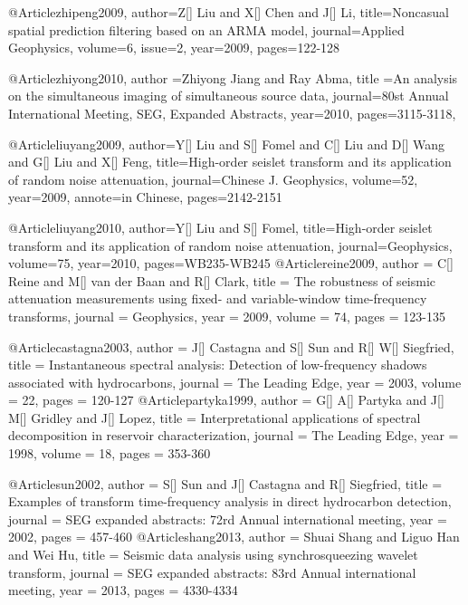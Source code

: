 @Article{zhipeng2009,
author={Z[] Liu and X[] Chen and J[] Li},
title={Noncasual spatial prediction filtering based on an ARMA model},
journal={Applied Geophysics},
volume=6,
issue=2,
year=2009,
pages={122-128}
}

@Article{zhiyong2010,
  author ={Zhiyong Jiang and Ray Abma},
  title ={An analysis on the simultaneous imaging of simultaneous source data},
  journal={80st Annual International Meeting, SEG, Expanded Abstracts},
  year=2010,
  pages={3115-3118},
}

@Article{liuyang2009,
author={Y[] Liu and S[] Fomel and C[] Liu and D[] Wang and G[] Liu and X[] Feng},
title={High-order seislet transform and its application of random noise attenuation},
journal={Chinese J. Geophysics},
volume=52,
year=2009,
annote={in Chinese},
pages={2142-2151}
}

@Article{liuyang2010,
author={Y[] Liu and S[] Fomel},
title={High-order seislet transform and its application of random noise attenuation},
journal={Geophysics},
volume=75,
year=2010,
pages={WB235-WB245}
}
@Article{reine2009,
  author = 	 {C[] Reine and M[] van der Baan and R[] Clark},
  title = 	 {The robustness of seismic attenuation measurements using fixed- and variable-window time-frequency transforms},
  journal = 	 {Geophysics},
  year = 	 2009,
  volume = 	 74,
  pages = 	 {123-135}
}


@Article{castagna2003,
  author = 	 {J[] Castagna and S[] Sun and R[] W[] Siegfried},
  title = 	 {Instantaneous spectral analysis: Detection of low-frequency shadows associated with hydrocarbons},
  journal = 	 {The Leading Edge},
  year = 	 2003,
  volume = 	 22,
  pages = 	 {120-127}
}
@Article{partyka1999,
  author = 	 {G[] A[] Partyka and J[] M[] Gridley and J[] Lopez},
  title = 	 {Interpretational applications of spectral decomposition in reservoir characterization},
  journal = 	 {The Leading Edge},
  year = 	 1998,
  volume = 	 18,
  pages = 	 {353-360}
}


@Article{sun2002,
  author = 	 {S[] Sun and J[] Castagna and R[] Siegfried},
  title = 	 {Examples of 
   transform time-frequency analysis in direct hydrocarbon detection},
  journal = 	 {SEG expanded abstracts: 72rd Annual international meeting},
  year = 	 2002,
  pages = 	 {457-460}
}
@Article{shang2013,
  author = 	 {Shuai Shang and Liguo Han and Wei Hu},
  title = 	 {Seismic data analysis using synchrosqueezing wavelet transform},
  journal = 	 {SEG expanded abstracts: 83rd Annual international meeting},
  year = 	 2013,
  pages = 	 {4330-4334}
}

